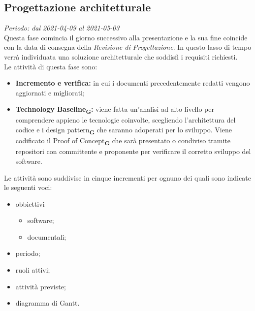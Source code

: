 \subsection{Progettazione architetturale}
\textit{Periodo: dal 2021-04-09 al 2021-05-03}\\
Questa fase comincia il giorno successivo alla presentazione e la sua fine coincide con la data di consegna della \textit{Revisione di Progettazione}. In questo lasso di tempo verrà individuata una soluzione architetturale che soddisfi i requisiti richiesti.\\
Le attività di questa fase sono:
\begin{itemize}
    \item \textbf{Incremento e verifica:} in cui i documenti precedentemente redatti vengono aggiornati e migliorati;
    \item \textbf{Technology Baseline\textsubscript{\textbf{G}}:} viene fatta un'analisi ad alto livello per comprendere appieno le tecnologie coinvolte, scegliendo l'architettura del codice e i design pattern\textsubscript{\textbf{G}} che saranno adoperati per lo sviluppo. Viene codificato il Proof of Concept\textsubscript{\textbf{G}} che sarà presentato o condiviso tramite repositori con committente e proponente per verificare il corretto sviluppo del software.
\end{itemize}
Le attività sono suddivise in cinque incrementi per ognuno dei quali sono indicate le seguenti voci:
\begin{itemize}
    \item obbiettivi
          \begin{itemize}
              \item software;
              \item documentali;
          \end{itemize}
    \item periodo;
    \item ruoli attivi;
    \item attività previste;
    \item diagramma di Gantt.
\end{itemize}

